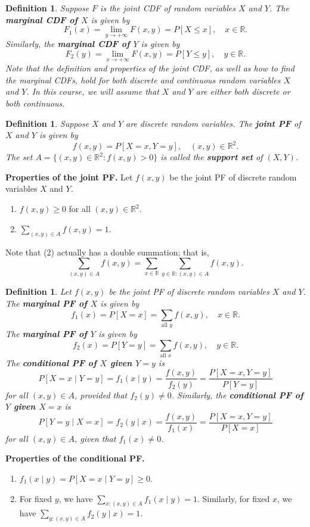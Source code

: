 \documentclass[10pt]{article}
\newcommand{\R}{\mathbb{R}}
\theoremstyle{newstyle}
\newtheorem{defn}[thm]{Definition}
\begin{document}
\begin{defn}
Suppose $F$ is the joint CDF of random variables $X$ and $Y$. 
The {\bf marginal CDF of $X$} is given by 
\[ F_1(x) = \lim_{y\to+\infty} F(x, y) = P[X \leq x], \quad x \in \R. \]
Similarly, the {\bf marginal CDF of $Y$} is given by 
\[ F_2(y) = \lim_{x\to+\infty} F(x, y) = P[Y \leq y], \quad y \in \R. \]
Note that the definition and properties of the joint CDF, as well as how to find 
the marginal CDFs, hold for both discrete and continuous random variables $X$ and $Y$.
In this course, we will assume that $X$ and $Y$ are either both discrete 
or both continuous.
\end{defn}

\begin{defn}
Suppose $X$ and $Y$ are discrete random variables. The {\bf joint PF} of $X$ and $Y$ is given by 
\[ f(x, y) = P[X = x, Y = y], \quad (x, y) \in \R^2. \]
The set $A = \{(x, y) \in \R^2 : f(x, y) > 0\}$ is called the {\bf support set} of $(X, Y)$.
\end{defn}

{\bf Properties of the joint PF.} Let $f(x, y)$ be the joint PF of discrete random variables $X$ and $Y$.
\begin{enumerate}[(1)]
    \item $f(x, y) \geq 0$ for all $(x, y) \in \R^2$.
    \item $\sum_{(x,y) \in A} f(x, y) = 1$.
\end{enumerate}
Note that (2) actually has a double summation; that is, 
\[ \sum_{(x, y) \in A} f(x, y) = \sum_{x \in \R} \sum_{y \in \R : (x, y) \in A} f(x, y). \]

\begin{defn}
Let $f(x, y)$ be the joint PF of discrete random variables $X$ and $Y$. 
The {\bf marginal PF of $X$} is given by 
\[ f_1(x) = P[X = x] = \sum_{\text{all } y} f(x, y), \quad x \in \R. \]
The {\bf marginal PF of $Y$} is given by 
\[ f_2(x) = P[Y = y] = \sum_{\text{all } x} f(x, y), \quad y \in \R. \]
The {\bf conditional PF of $X$ given $Y = y$} is 
\[ P[X = x \mid Y = y] = f_1(x \mid y) = \frac{f(x,y)}{f_2(y)} = \frac{P[X=x, Y=y]}{P[Y=y]} \]
for all $(x, y) \in A$, provided that $f_2(y) \neq 0$. 
Similarly, the {\bf conditional PF of $Y$ given $X = x$} is 
\[ P[Y = y \mid X = x] = f_2(y \mid x) = \frac{f(x,y)}{f_1(x)} = \frac{P[X=x, Y=y]}{P[X=x]} \]
for all $(x, y) \in A$, given that $f_1(x) \neq 0$.
\end{defn}

{\bf Properties of the conditional PF.} 
\begin{enumerate}[(1)]
    \item $f_1(x \mid y) = P[X = x \mid Y = y] \geq 0$. 
    \item For fixed $y$, we have $\sum_{x : (x, y) \in A} f_1(x \mid y) = 1$. 
    Similarly, for fixed $x$, we have $\sum_{y: (x, y) \in A} f_2(y \mid x) = 1$.
\end{enumerate}
\end{document}
